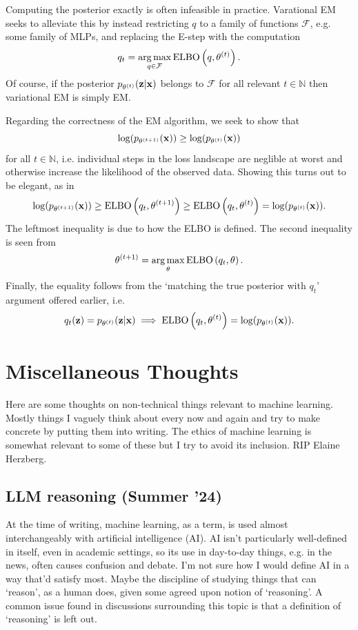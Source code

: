 \documentclass[11pt]{article}
\begin{document}
\begin{appendices}
\begin{tcolorbox}[title={\centering\textbf{Variational EM}}, colback=myLightBlue, colbacktitle=myDarkBlue, colframe=myDarkBlue, coltitle=white]
    Computing the posterior exactly is often infeasible in practice. Varational EM seeks to alleviate this by instead restricting $q$ to a family of functions $\mathcal{F}$, e.g. some family of MLPs, and replacing the E-step with the computation
    $$
    q_t
    =
    \operatorname*{arg\,max}_{q\in\mathcal{F}}\text{ELBO}\left(q,\theta^{(t)}\right).
    $$
    Of course, if the posterior $p_{\theta^{(t)}}(\mathbf{z}|\mathbf{x})$ belongs to $\mathcal{F}$ for all relevant $t\in\mathbb{N}$ then variational EM is simply EM.
\end{tcolorbox}
Regarding the correctness of the EM algorithm, we seek to show that
$$
\log(p_{\theta^{(t+1)}}(\mathbf{x}))
\geq
\log(p_{\theta^{(t)}}(\mathbf{x}))
$$
for all $t\in\mathbb{N}$, i.e. individual steps in the loss landscape are neglible at worst and otherwise increase the likelihood of the observed data. Showing this turns out to be elegant, as in
$$
\log(p_{\theta^{(t+1)}}(\mathbf{x}))
\geq
\text{ELBO}\left(q_t,\theta^{(t+1)}\right)
\geq
\text{ELBO}\left(q_t,\theta^{(t)}\right)
=
\log(p_{\theta^{(t)}}(\mathbf{x})).
$$
The leftmost inequality is due to how the ELBO is defined. The second inequality is seen from
$$
\theta^{(t+1)}
=
\operatorname*{arg\,max}_{\theta}\text{ELBO}\left(q_t,\theta\right).
$$
Finally, the equality follows from the `matching the true posterior with $q_t$' argument offered earlier, i.e.
$$
q_t(\mathbf{z})=p_{\theta^{(t)}}(\mathbf{z}|\mathbf{x})
\implies
\text{ELBO}\left(q_t,\theta^{(t)}\right)=\log(p_{\theta^{(t)}}(\mathbf{x})).
$$

\section{Miscellaneous Thoughts}
Here are some thoughts on non-technical things relevant to machine learning. Mostly things I vaguely think about every now and again and try to make concrete by putting them into writing. The ethics of machine learning is somewhat relevant to some of these but I try to avoid its inclusion. RIP Elaine Herzberg.

\subsection{LLM reasoning (Summer '24)}

At the time of writing, machine learning, as a term, is used almost interchangeably with artificial intelligence (AI). AI isn't particularly well-defined in itself, even in academic settings, so its use in day-to-day things, e.g. in the news, often causes confusion and debate. I'm not sure how I would define AI in a way that'd satisfy most. Maybe the discipline of studying things that can `reason', as a human does, given some agreed upon notion of `reasoning'. A common issue found in discussions surrounding this topic is that a definition of `reasoning' is left out.


\end{appendices}
\end{document}
